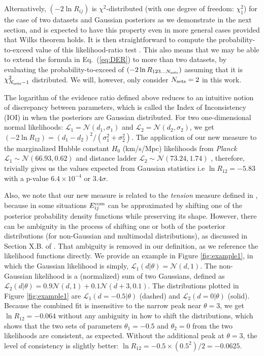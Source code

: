 \documentclass[amsmath, amssymb, reprint, aps]{revtex4-1}
\begin{document}
    {Alternatively, $(-2\ln R_{ij})$ is $\chi^2$-distributed (with one degree of freedom: $\chi^2_1$) for the case of two datasets and Gaussian posteriors as we demonstrate  in the next section, and is expected to have this property even in more general cases provided that Wilks theorem \cite{Wilks} holds. It is then straightforward to compute the probability-to-exceed value of this likelihood-ratio test \cite{kassr95}. This also means that we may be able to extend the formula in Eq.~(\ref{eq:DER}) to more than two datasets, by evaluating the probability-to-exceed of $(-2\ln R_{123...N_{\rm sets}})$ assuming that it is $\chi^2_{N_{\rm sets}-1}$ distributed. We will, however, only consider $N_{\rm sets}=2$ in this work.
        
    The logarithm of the evidence ratio defined above reduces to an intuitive notion of discrepancy between parameters, which is called the Index of Inconsistency (IOI) in \cite{Lin:2017ikq} when the posteriors are Gaussian distributed. For two one-dimensional normal likelihoods: $\mathcal{L}_1 = \mathcal{N}(d_1, \sigma_1)$ and $\mathcal{L}_2 = \mathcal{N}(d_2, \sigma_2)$, we get $(-2\ln R_{12})=(d_1-d_2)^2/(\sigma_1^2+\sigma_2^2)$. The application of our new measure to the marginalized Hubble constant $H_0$ (km/s/Mpc) likelihoods from {\it Planck} $\mathcal{L}_1 \sim \mathcal{N}(66.93, 0.62)$ \cite{Ade:2015xua} and distance ladder $\mathcal{L}_2 \sim \mathcal{N}(73.24, 1.74)$ \cite{Riess:2016jrr}, therefore, trivially gives us the values expected from Gaussian statistics i.e $\ln R_{12} = -5.83$ \cite{Lin:2017bhs} with a p-value $6.4\times 10^{-4}$ or $3.4\sigma$.
        
    Also, we note that our new measure is related to the \textit{tension} measure defined in \cite{Verde:2013wza}, because in some situations $E_{ij}^{\rm com}$ can be approximated by shifting one of the posterior probability density functions while preserving its shape. However, there can be ambiguity in the process of shifting one or both of the posterior distributions (for non-Gaussian and multimodal distributions), as discussed in Section X.B. of \cite{Lin:2017ikq}. That ambiguity is removed in our definition, as we reference the likelihood functions directly. We provide an example in Figure \ref{fig:example1}, in which the Gaussian likelihood is simply, $\mathcal{L}_1(d|\theta) = \mathcal{N}(d, 1)$. The non-Gaussian likelihood is a (normalized) sum of two Gaussians, defined as $\mathcal{L}_2(d|\theta) = 0.9 \mathcal{N}(d, 1) + 0.1 \mathcal{N}(d+3, 0.1)$. The distributions plotted in Figure \ref{fig:example1} are $\mathcal{L}_1(d=-0.5|\theta)$ (dashed) and $\mathcal{L}_2(d=0|\theta)$ (solid). Because the combined fit is insensitive to the narrow peak near $\theta=3$, we get $\ln R_{12}=-0.064$ without any ambiguity in how to shift the distributions, which shows that the two sets of parameters $\theta_1=-0.5$ and $\theta_2=0$ from the two likelihoods are consistent, as expected. Without the additional peak at $\theta=3$, the level of consistency is slightly better: $\ln R_{12} = -0.5\times(0.5^2)/2 = -0.0625$.
        
}
\end{document}
